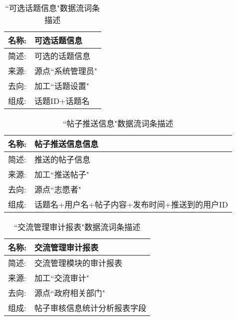 \begin{table}[H]  
\caption{``可选话题信息"数据流词条描述}  
\begin{center}  
    \begin{tabular}{l p{11cm}} 
        \hline
        \quad 名称:  &  可选话题信息 \\
        \hline
        \quad 简述:  & 可选的话题信息 \\
        \hline
        \quad 来源:  & 源点``系统管理员" \\
        \hline
        \quad 去向:  & 加工``话题设置" \\
        \hline
        \quad 组成:  & 话题ID+话题名 \\
        \hline
    \end{tabular}
    \label{tab1}
\end{center}
\end{table}

\begin{table}[H]  
\caption{``帖子推送信息"数据流词条描述}  
\begin{center}  
    \begin{tabular}{l p{11cm}} 
        \hline
        \quad 名称:  &  帖子推送信息信息 \\
        \hline
        \quad 简述:  & 推送的帖子信息 \\
        \hline
        \quad 来源:  & 加工``推送帖子" \\
        \hline
        \quad 去向:  & 源点``志愿者" \\
        \hline
        \quad 组成:  & 话题名+用户名+帖子内容+发布时间+推送到的用户ID \\
        \hline
    \end{tabular}
    \label{tab1}
\end{center}
\end{table}


\begin{table}[H]  
\caption{``交流管理审计报表"数据流词条描述}  
\begin{center}  
    \begin{tabular}{l p{11cm}} 
        \hline
        \quad 名称:  & 交流管理审计报表 \\
        \hline
        \quad 简述:  & 交流管理模块的审计报表 \\
        \hline
        \quad 来源:  & 加工``交流审计" \\
        \hline
        \quad 去向:  & 源点``政府相关部门" \\
        \hline
        \quad 组成:  & 帖子审核信息统计分析报表字段 \\
        \hline
    \end{tabular}
    \label{tab1}
\end{center}
\end{table}

